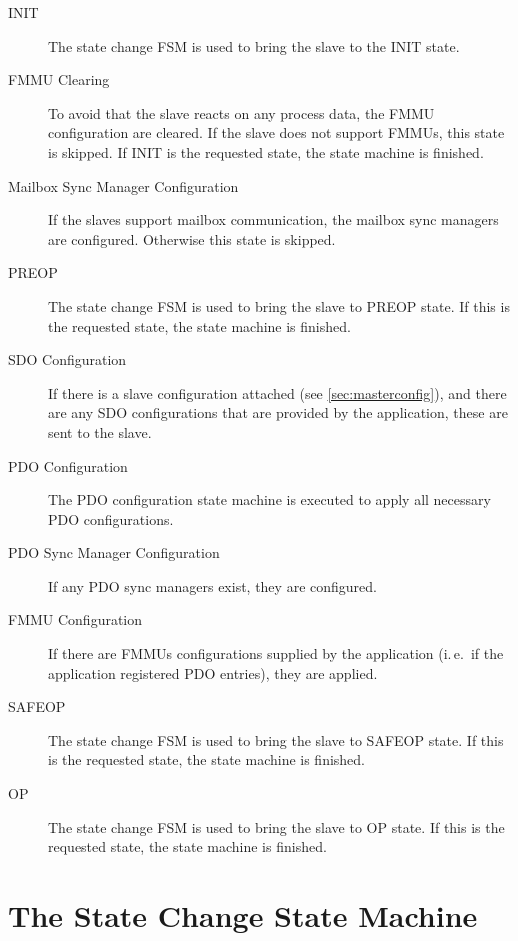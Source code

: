 \documentclass[a4paper,12pt,BCOR=6mm,bibtotoc,idxtotoc]{scrbook}
\begin{document}
\begin{description}

\item[INIT] The state change FSM is used to bring the slave to the INIT state.

\item[FMMU Clearing] To avoid that the slave reacts on any process data, the
FMMU configuration are cleared. If the slave does not support FMMUs, this
state is skipped. If INIT is the requested state, the state machine is
finished.

\item[Mailbox Sync Manager Configuration] If the slaves support mailbox
communication, the mailbox sync managers are configured. Otherwise this state
is skipped.

\item[PREOP] The state change FSM is used to bring the slave to PREOP state.
If this is the requested state, the state machine is finished.

\item[SDO Configuration] If there is a slave configuration attached (see
\autoref{sec:masterconfig}), and there are any SDO configurations that are
provided by the application, these are sent to the slave.

\item[PDO Configuration] The PDO configuration state machine is executed to
apply all necessary PDO configurations.

\item[PDO Sync Manager Configuration] If any PDO sync managers exist, they are
configured.

\item[FMMU Configuration] If there are FMMUs configurations supplied by the
application (i.\,e.\ if the application registered PDO entries), they are
applied.

\item[SAFEOP] The state change FSM is used to bring the slave to SAFEOP state.
If this is the requested state, the state machine is finished.

\item[OP] The state change FSM is used to bring the slave to OP state.
If this is the requested state, the state machine is finished.

\end{description}


\section{The State Change State Machine}
\label{sec:fsm-change}
\end{document}
